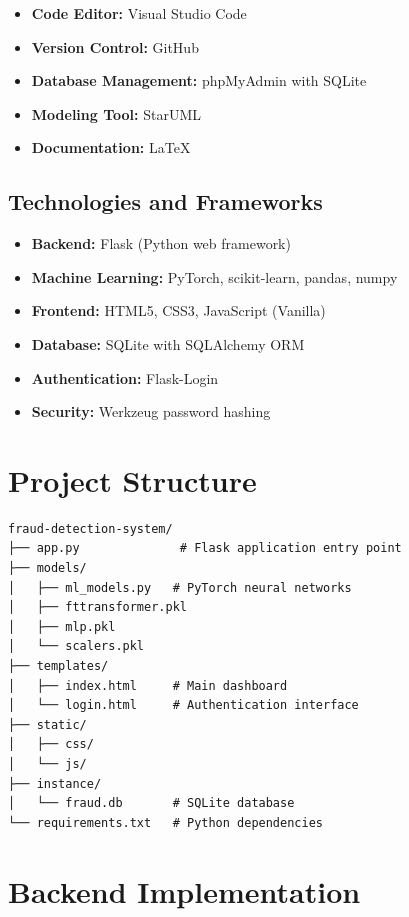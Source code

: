 \documentclass[12pt,a4paper,twoside]{report}
\begin{document}
\begin{itemize}
    \item \textbf{Code Editor:} Visual Studio Code
    \item \textbf{Version Control:} GitHub
    \item \textbf{Database Management:} phpMyAdmin with SQLite
    \item \textbf{Modeling Tool:} StarUML
    \item \textbf{Documentation:} LaTeX
\end{itemize}

\subsection{Technologies and Frameworks}

\begin{itemize}
    \item \textbf{Backend:} Flask (Python web framework)
    \item \textbf{Machine Learning:} PyTorch, scikit-learn, pandas, numpy
    \item \textbf{Frontend:} HTML5, CSS3, JavaScript (Vanilla)
    \item \textbf{Database:} SQLite with SQLAlchemy ORM
    \item \textbf{Authentication:} Flask-Login
    \item \textbf{Security:} Werkzeug password hashing
\end{itemize}

\section{Project Structure}

\begin{verbatim}
fraud-detection-system/
├── app.py              # Flask application entry point
├── models/
│   ├── ml_models.py   # PyTorch neural networks
│   ├── fttransformer.pkl
│   ├── mlp.pkl
│   └── scalers.pkl
├── templates/
│   ├── index.html     # Main dashboard
│   └── login.html     # Authentication interface
├── static/
│   ├── css/
│   └── js/
├── instance/
│   └── fraud.db       # SQLite database
└── requirements.txt   # Python dependencies
\end{verbatim}

\section{Backend Implementation}
\end{document}

